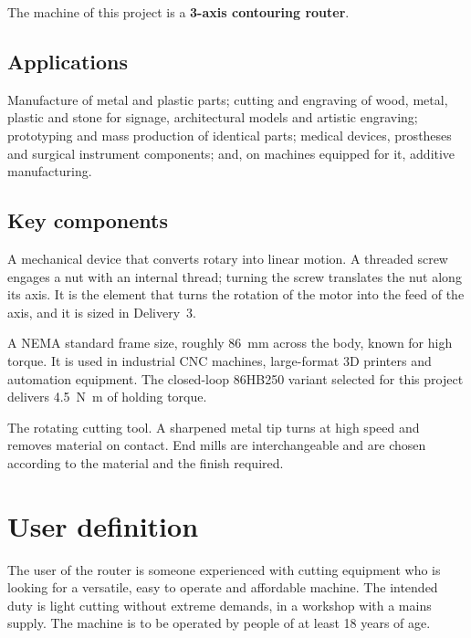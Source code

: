 \documentclass[11pt]{article}
\begin{document}
The machine of this project is a \textbf{3-axis contouring router}.

\subsection{Applications}

Manufacture of metal and plastic parts; cutting and engraving of wood, metal, plastic and
stone for signage, architectural models and artistic engraving; prototyping and mass
production of identical parts; medical devices, prostheses and surgical instrument
components; and, on machines equipped for it, additive manufacturing.

\subsection{Key components}

\begin{description}[leftmargin=0pt,style=nextline]
  \item[Power screw] A mechanical device that converts rotary into linear motion. A
        threaded screw engages a nut with an internal thread; turning the screw
        translates the nut along its axis. It is the element that turns the rotation of
        the motor into the feed of the axis, and it is sized in Delivery~3.
  \item[NEMA 34 stepper motor] A NEMA standard frame size, roughly \SI{86}{\milli\metre}
        across the body, known for high torque. It is used in industrial CNC machines,
        large-format 3D printers and automation equipment. The closed-loop 86HB250 variant
        selected for this project delivers \SI{4.5}{\newton\metre} of holding torque.
  \item[End mill] The rotating cutting tool. A sharpened metal tip turns at high speed and
        removes material on contact. End mills are interchangeable and are chosen
        according to the material and the finish required.
\end{description}

\section{User definition}

The user of the router is someone experienced with cutting equipment who is looking for a
versatile, easy to operate and affordable machine. The intended duty is light cutting
without extreme demands, in a workshop with a mains supply. The machine is to be operated
by people of at least 18 years of age.
\end{document}
